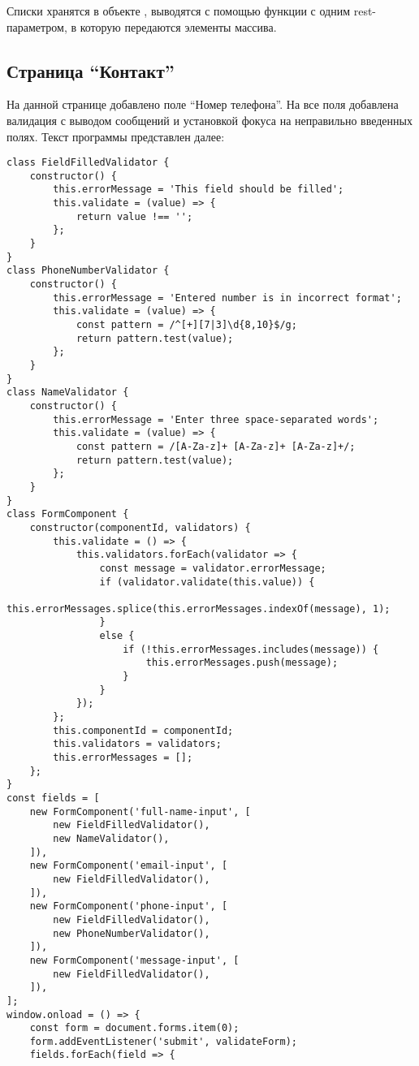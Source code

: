 \documentclass[a4paper,14pt]{extarticle}
\begin{document}
Списки хранятся в объекте , выводятся с помощью
функции с одним rest-параметром, в которую передаются элементы массива.

\subsection{Страница \enquote{Контакт}}
На данной странице добавлено поле \enquote{Номер телефона}. На все поля
добавлена валидация с выводом сообщений и установкой фокуса на
неправильно введенных полях. Текст программы представлен далее:
\begin{lstlisting}
class FieldFilledValidator {
    constructor() {
        this.errorMessage = 'This field should be filled';
        this.validate = (value) => {
            return value !== '';
        };
    }
}
class PhoneNumberValidator {
    constructor() {
        this.errorMessage = 'Entered number is in incorrect format';
        this.validate = (value) => {
            const pattern = /^[+][7|3]\d{8,10}$/g;
            return pattern.test(value);
        };
    }
}
class NameValidator {
    constructor() {
        this.errorMessage = 'Enter three space-separated words';
        this.validate = (value) => {
            const pattern = /[A-Za-z]+ [A-Za-z]+ [A-Za-z]+/;
            return pattern.test(value);
        };
    }
}
class FormComponent {
    constructor(componentId, validators) {
        this.validate = () => {
            this.validators.forEach(validator => {
                const message = validator.errorMessage;
                if (validator.validate(this.value)) {
                    this.errorMessages.splice(this.errorMessages.indexOf(message), 1);
                }
                else {
                    if (!this.errorMessages.includes(message)) {
                        this.errorMessages.push(message);
                    }
                }
            });
        };
        this.componentId = componentId;
        this.validators = validators;
        this.errorMessages = [];
    };
}
const fields = [
    new FormComponent('full-name-input', [
        new FieldFilledValidator(),
        new NameValidator(),
    ]),
    new FormComponent('email-input', [
        new FieldFilledValidator(),
    ]),
    new FormComponent('phone-input', [
        new FieldFilledValidator(),
        new PhoneNumberValidator(),
    ]),
    new FormComponent('message-input', [
        new FieldFilledValidator(),
    ]),
];
window.onload = () => {
    const form = document.forms.item(0);
    form.addEventListener('submit', validateForm);
    fields.forEach(field => {

\end{lstlisting}
\end{document}
